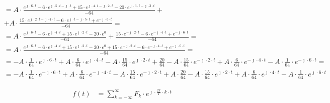 \begin{task}
\begin{align*}
&=A\cdot \frac{e^{\jmath \cdot 6 \cdot t} - 6 \cdot e^{\jmath \cdot 5 \cdot t -\jmath \cdot t} + 15 \cdot e^{\jmath \cdot 4 \cdot t -\jmath \cdot 2 \cdot t} - 20 \cdot e^{\jmath \cdot 3 \cdot t -\jmath \cdot 3 \cdot t}}{-64}+\\
&+A\cdot \frac{15 \cdot e^{\jmath \cdot 2\cdot t -\jmath \cdot 4 \cdot t} - 6 \cdot e^{\jmath \cdot t -\jmath \cdot 5 \cdot t} + e^{-\jmath \cdot 6 \cdot t}}{-64}=\\
&=A\cdot \frac{e^{\jmath \cdot 6 \cdot t} - 6 \cdot e^{\jmath \cdot 4 \cdot t} + 15 \cdot e^{\jmath \cdot 2 \cdot t} - 20 \cdot e^{0}}{-64}+\frac{15 \cdot e^{-\jmath \cdot 2\cdot t} - 6 \cdot e^{-\jmath \cdot 4 \cdot t} + e^{-\jmath \cdot 6 \cdot t}}{-64}=\\
&=A\cdot \frac{e^{\jmath \cdot 6 \cdot t} - 6 \cdot e^{\jmath \cdot 4 \cdot t} + 15 \cdot e^{\jmath \cdot 2 \cdot t} - 20 \cdot e^{0} + 15 \cdot e^{-\jmath \cdot 2\cdot t} - 6 \cdot e^{-\jmath \cdot 4 \cdot t} + e^{-\jmath \cdot 6 \cdot t}}{-64}=\\
&=-A\cdot \frac{1}{64} \cdot e^{\jmath \cdot 6 \cdot t} + A\cdot \frac{6}{64} \cdot e^{\jmath \cdot 4 \cdot t} - A\cdot \frac{15}{64} \cdot e^{\jmath \cdot 2 \cdot t} + \frac{20}{64} - A\cdot \frac{15}{64} \cdot e^{-\jmath \cdot 2\cdot t} + A\cdot\frac{6}{64} \cdot e^{-\jmath \cdot 4 \cdot t} - A\cdot \frac{1}{64} \cdot e^{-\jmath \cdot 6 \cdot t}=\\
&=-A\cdot \frac{1}{64} \cdot e^{-\jmath \cdot 6 \cdot t} + A\cdot \frac{6}{64} \cdot e^{-\jmath \cdot 4 \cdot t} - A\cdot \frac{15}{64} \cdot e^{-\jmath \cdot 2 \cdot t} + A\cdot \frac{20}{64} - A\cdot \frac{15}{64} \cdot e^{\jmath \cdot 2\cdot t} +A\cdot \frac{6}{64} \cdot e^{\jmath \cdot 4 \cdot t} - A\cdot \frac{1}{64} \cdot e^{\jmath \cdot 6 \cdot t}
\end{align*}


\begin{align*}
f(t) &= \sum_{k=-\infty}^{\infty} F_k \cdot e^{\jmath \cdot \frac{2\pi}{T} \cdot k \cdot t}
\end{align*}



\end{task}
